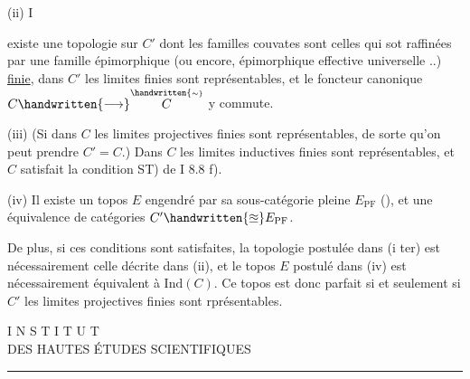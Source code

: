 (ii)  I existe une topologie sur $C'$ dont les familles couvates sont celles qui sot raffinées par une famille épimorphique (ou encore, épimorphique effective universelle ..) \uline{finie}, dans $C'$ les limites  finies sont représentables, et le foncteur canonique $C\handwritten{\longrightarrow}\overset{\handwritten{\scriptscriptstyle\sim}}{C}$  y commute.

(iii) (Si dans $C$ les limites projectives finies sont représentables, de sorte qu'on peut prendre $C'=C$.) Dans $C$ les limites inductives finies sont représentables, et $C$ satisfait la condition ST) de
\reversemarginpar\margin{\handwritten{$\times$}}\normalmarginpar
I 8.8 f).

(iv) Il existe un topos $E$ engendré par sa sous-catégorie pleine
\reversemarginpar\margin{\handwritten{$\times$}}\normalmarginpar
$E_{\mathrm{PF}}$ (\quad\quad), et une équivalence de catégories $C'\handwritten{\approxeq}E_{\mathrm{PF}}$.

De plus,  si ces conditions sont satisfaites, la topologie postulée dans (i ter) est nécessairement celle décrite dans (ii), et le topos $E$ postulé dans (iv) est nécessairement équivalent à $\mathrm{Ind}(C)$. Ce topos est donc parfait si et seulement si  $C'$  les limites projectives finies sont rprésentables.

\noindent\begin{minipage}{0.66\textwidth}
\centering
I N S T I T U T\\
DES HAUTES ÉTUDES SCIENTIFIQUES\\
\rule{1cm}{0.4pt}
\end{minipage}



